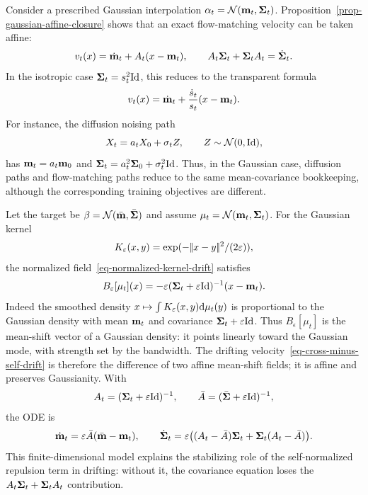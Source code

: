 \begin{example}
	Consider a prescribed Gaussian interpolation $\alpha_t=\mathcal{N}(\mathbf{m}_t,\mathbf{\Sigma}_t)$. Proposition~\ref{prop-gaussian-affine-closure} shows that an exact flow-matching velocity can be taken affine:
	\[
		v_t(x)=\dot{\mathbf{m}}_t+A_t(x-\mathbf{m}_t),
		\qquad
		A_t\mathbf{\Sigma}_t+\mathbf{\Sigma}_t A_t=\dot{\mathbf{\Sigma}}_t.
	\]
	In the isotropic case $\mathbf{\Sigma}_t=s_t^2\mathrm{Id}$, this reduces to the transparent formula
	\[
		v_t(x)=\dot{\mathbf{m}}_t+\frac{\dot s_t}{s_t}(x-\mathbf{m}_t).
	\]
	For instance, the diffusion noising path
	\[
		X_t=a_tX_0+\sigma_t Z,\qquad Z\sim\mathcal{N}(0,\mathrm{Id}),
	\]
	has $\mathbf{m}_t=a_t\mathbf{m}_0$ and $\mathbf{\Sigma}_t=a_t^2\mathbf{\Sigma}_0+\sigma_t^2\mathrm{Id}$. Thus, in the Gaussian case, diffusion paths and flow-matching paths reduce to the same mean-covariance bookkeeping, although the corresponding training objectives are different.
\end{example}

\begin{example}
	Let the target be $\beta=\mathcal{N}(\bar{\mathbf{m}},\bar{\mathbf{\Sigma}})$ and assume $\mu_t=\mathcal{N}(\mathbf{m}_t,\mathbf{\Sigma}_t)$. For the Gaussian kernel
	\[
		K_\varepsilon(x,y)=\exp(-|\!| x-y |\!|^2/(2\varepsilon)),
	\]
	the normalized field~\eqref{eq-normalized-kernel-drift} satisfies
	\[
		B_\varepsilon[\mu_t](x)
		=
		-\varepsilon(\mathbf{\Sigma}_t+\varepsilon\mathrm{Id})^{-1}(x-\mathbf{m}_t).
	\]
	Indeed the smoothed density \(x\mapsto\int K_\varepsilon(x,y)\mathrm{d}\mu_t(y)\) is proportional to the Gaussian density with mean $\mathbf{m}_t$ and covariance $\mathbf{\Sigma}_t+\varepsilon\mathrm{Id}$. Thus \(B_\epsilon[\mu_t]\) is the mean-shift vector of a Gaussian density: it points linearly toward the Gaussian mode, with strength set by the bandwidth. The drifting velocity~\eqref{eq-cross-minus-self-drift} is therefore the difference of two affine mean-shift fields; it is affine and preserves Gaussianity. With
	\[
		A_t=(\mathbf{\Sigma}_t+\varepsilon\mathrm{Id})^{-1},
		\qquad
		\bar A=(\bar{\mathbf{\Sigma}}+\varepsilon\mathrm{Id})^{-1},
	\]
	the ODE is
	\[
		\dot{\mathbf{m}}_t=\varepsilon\bar A(\bar{\mathbf{m}}-\mathbf{m}_t),
		\qquad
		\dot{\mathbf{\Sigma}}_t=\varepsilon\bigl((A_t-\bar A)\mathbf{\Sigma}_t+\mathbf{\Sigma}_t(A_t-\bar A)\bigr).
	\]
	This finite-dimensional model explains the stabilizing role of the self-normalized repulsion term in drifting: without it, the covariance equation loses the $A_t\mathbf{\Sigma}_t+\mathbf{\Sigma}_tA_t$ contribution.
\end{example}

